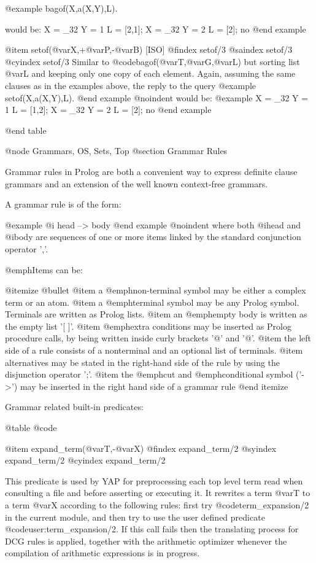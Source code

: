 {{{{{{@example
bagof(X,a(X,Y),L).

would be:
X = _32
Y = 1
L = [2,1];
X = _32
Y = 2
L = [2];
no
@end example

@item setof(@var{X},+@var{P},-@var{B}) [ISO]
@findex setof/3
@saindex setof/3
@cyindex setof/3
Similar to @code{bagof(@var{T},@var{G},@var{L})} but sorting list
@var{L} and keeping only one copy of each element.  Again, assuming the
same clauses as in the examples above, the reply to the query
@example
setof(X,a(X,Y),L).
@end example
@noindent
would be:
@example
X = _32
Y = 1
L = [1,2];
X = _32
Y = 2
L = [2];
no
@end example

@end table

@node Grammars, OS, Sets, Top
@section Grammar Rules

Grammar rules in Prolog are both a convenient way to express definite
clause grammars and  an extension of the well known context-free grammars.

A grammar rule is of the form:

@example
@i{ head --> body }
@end example
@noindent
where both @i{head} and @i{body} are sequences of one or more items
linked by the standard conjunction operator ','.

@emph{Items can be:}

@itemize @bullet
@item
a @emph{non-terminal} symbol may be either a complex term or an atom.
@item
a @emph{terminal} symbol may be any Prolog symbol. Terminals are
written as Prolog lists.
@item
an @emph{empty body} is written as the empty list '[ ]'.
@item
@emph{extra conditions} may be inserted as Prolog procedure calls, by being
written inside curly brackets '@{' and '@}'.
@item
the left side of a rule consists of a nonterminal and an optional list
of terminals.
@item
alternatives may be stated in the right-hand side of the rule by using
the disjunction operator ';'.
@item
the @emph{cut} and @emph{conditional} symbol ('->') may be inserted in the 
right hand side of a grammar rule
@end itemize

Grammar related built-in predicates:

@table @code

@item expand_term(@var{T},-@var{X})
@findex expand_term/2
@syindex expand_term/2
@cyindex expand_term/2

This predicate is used by YAP for preprocessing each top level
term read when consulting a file and before asserting or executing it.
It rewrites a term @var{T} to a term @var{X} according to the following
rules: first try @code{term_expansion/2}  in the current module, and then try to use the user defined predicate
@code{user:term_expansion/2}. If this call fails then the translating process
for DCG rules is applied, together with the arithmetic optimizer
whenever the compilation of arithmetic expressions is in progress.

}}}}}}
